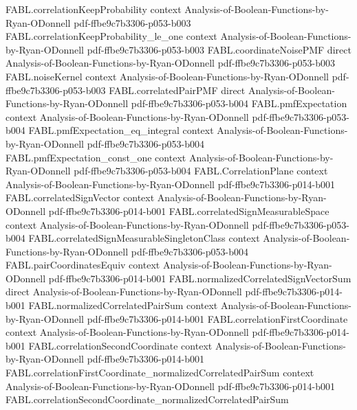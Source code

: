 \begin{theorem}
\proofstep
  {FABL.correlationKeepProbability}
  {context}
  {Analysis-of-Boolean-Functions-by-Ryan-ODonnell}
  {pdf-ffbe9c7b3306-p053-b003}
\proofstep
  {FABL.correlationKeepProbability_le_one}
  {context}
  {Analysis-of-Boolean-Functions-by-Ryan-ODonnell}
  {pdf-ffbe9c7b3306-p053-b003}
\proofstep
  {FABL.coordinateNoisePMF}
  {direct}
  {Analysis-of-Boolean-Functions-by-Ryan-ODonnell}
  {pdf-ffbe9c7b3306-p053-b003}
\proofstep
  {FABL.noiseKernel}
  {context}
  {Analysis-of-Boolean-Functions-by-Ryan-ODonnell}
  {pdf-ffbe9c7b3306-p053-b003}
\proofstep
  {FABL.correlatedPairPMF}
  {direct}
  {Analysis-of-Boolean-Functions-by-Ryan-ODonnell}
  {pdf-ffbe9c7b3306-p053-b004}
\proofstep
  {FABL.pmfExpectation}
  {context}
  {Analysis-of-Boolean-Functions-by-Ryan-ODonnell}
  {pdf-ffbe9c7b3306-p053-b004}
\proofstep
  {FABL.pmfExpectation_eq_integral}
  {context}
  {Analysis-of-Boolean-Functions-by-Ryan-ODonnell}
  {pdf-ffbe9c7b3306-p053-b004}
\proofstep
  {FABL.pmfExpectation_const_one}
  {context}
  {Analysis-of-Boolean-Functions-by-Ryan-ODonnell}
  {pdf-ffbe9c7b3306-p053-b004}
\proofstep
  {FABL.CorrelationPlane}
  {context}
  {Analysis-of-Boolean-Functions-by-Ryan-ODonnell}
  {pdf-ffbe9c7b3306-p014-b001}
\proofstep
  {FABL.correlatedSignVector}
  {context}
  {Analysis-of-Boolean-Functions-by-Ryan-ODonnell}
  {pdf-ffbe9c7b3306-p014-b001}
\proofstep
  {FABL.correlatedSignMeasurableSpace}
  {context}
  {Analysis-of-Boolean-Functions-by-Ryan-ODonnell}
  {pdf-ffbe9c7b3306-p053-b004}
\proofstep
  {FABL.correlatedSignMeasurableSingletonClass}
  {context}
  {Analysis-of-Boolean-Functions-by-Ryan-ODonnell}
  {pdf-ffbe9c7b3306-p053-b004}
\proofstep
  {FABL.pairCoordinatesEquiv}
  {context}
  {Analysis-of-Boolean-Functions-by-Ryan-ODonnell}
  {pdf-ffbe9c7b3306-p014-b001}
\proofstep
  {FABL.normalizedCorrelatedSignVectorSum}
  {direct}
  {Analysis-of-Boolean-Functions-by-Ryan-ODonnell}
  {pdf-ffbe9c7b3306-p014-b001}
\proofstep
  {FABL.normalizedCorrelatedPairSum}
  {context}
  {Analysis-of-Boolean-Functions-by-Ryan-ODonnell}
  {pdf-ffbe9c7b3306-p014-b001}
\proofstep
  {FABL.correlationFirstCoordinate}
  {context}
  {Analysis-of-Boolean-Functions-by-Ryan-ODonnell}
  {pdf-ffbe9c7b3306-p014-b001}
\proofstep
  {FABL.correlationSecondCoordinate}
  {context}
  {Analysis-of-Boolean-Functions-by-Ryan-ODonnell}
  {pdf-ffbe9c7b3306-p014-b001}
\proofstep
  {FABL.correlationFirstCoordinate_normalizedCorrelatedPairSum}
  {context}
  {Analysis-of-Boolean-Functions-by-Ryan-ODonnell}
  {pdf-ffbe9c7b3306-p014-b001}
\proofstep
  {FABL.correlationSecondCoordinate_normalizedCorrelatedPairSum}

\end{theorem}
